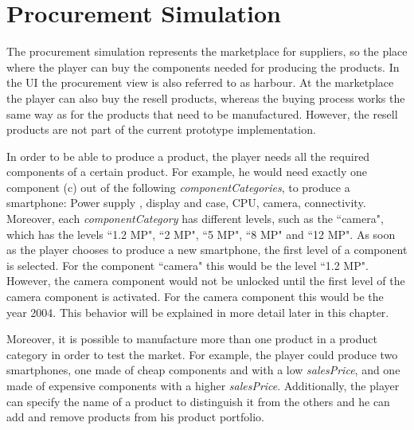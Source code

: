 \section{Procurement Simulation}
\label{procuresim}
The procurement simulation represents the marketplace for suppliers, so  the place where the player can buy the components needed for producing the products. In the UI the procurement view is also referred to as harbour. At the marketplace the player can also buy the resell products, whereas the buying process works the same way as for the products that need to be manufactured. However, the resell products are not part of the current prototype implementation.

In order to be able to produce a product, the player needs all the required components of a certain product. For example, he would need exactly one component (\gls{c}) out of the following \textit{componentCategories}, to produce a smartphone: Power supply , display and case, CPU, camera, connectivity. Moreover, each \textit{componentCategory} has different levels, such as the ``camera", which has the levels ``1.2 MP", ``2 MP", ``5 MP", ``8 MP" and ``12 MP".  As soon as the player chooses to produce a new smartphone, the first level of a component is selected. For the component ``camera" this would be the level ``1.2 MP". However, the camera component would not be unlocked until the first level of the camera component is activated. For the camera component this would be the year 2004. This behavior will be explained in more detail later in this chapter.

Moreover, it is possible to manufacture more than one product in a product category in order to test the market. For example, the player could produce two smartphones, one made of cheap components and with a low \textit{salesPrice}, and one made of expensive components with a higher \textit{salesPrice}. Additionally, the player can specify the name of a product to distinguish it from the others and he can add and remove products from his product portfolio.

